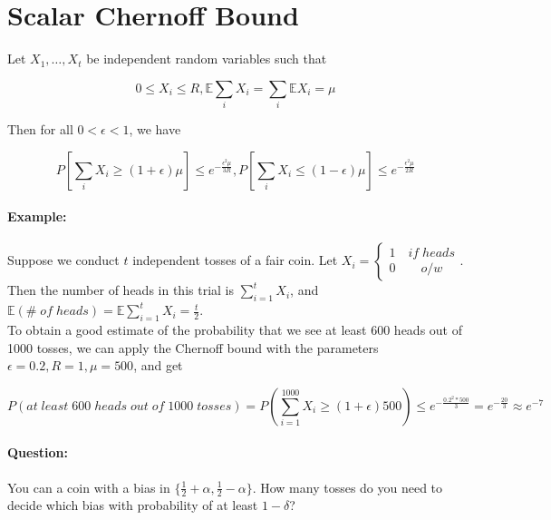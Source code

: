 \documentclass[11pt]{article}
\begin{document}
\newcommand{\coursenum}{{CSC 2421H}}
\newcommand{\coursename}{{Graphs, Matrices, and Optimization}}
\newcommand{\courseprof}{Sushant Sachdeva}


\section{Scalar Chernoff Bound}

\begin{definition}
Let $X_1, \dots, X_t$ be independent random variables such that 

\[
	0 \le X_i \le R, \mathbb{E} \sum_{i} X_i = \sum_{i} \mathbb{E} X_i = \mu
\]

Then for all $0<\epsilon<1$, we have

\[
	P[\sum_{i} X_i \ge (1+\epsilon)\mu] \le e^{-\frac{\epsilon^2 \mu}{3R}}, P[\sum_{i} X_i \le (1-\epsilon)\mu] \le e^{-\frac{\epsilon^2 \mu}{2R}}
\]

\end{definition}

\paragraph{Example:} 

Suppose we conduct $t$ independent tosses of a fair coin. Let $X_i=\begin{cases} 1 \quad if \; heads \\ 0 \qquad o/w \end{cases}$. Then the number of heads in this trial is $\sum_{i=1}^{t} X_i$, and $\mathbb{E}(\# \; of \; heads)=\mathbb{E}\sum_{i=1}^{t} X_i = \frac{t}{2}$.\\

To obtain a good estimate of the probability that we see at least 600 heads out of 1000 tosses, we can apply the Chernoff bound with the parameters $\epsilon=0.2, R=1, \mu=500$, and get

\[
	P(at \; least \; 600 \; heads \; out \; of \; 1000 \; tosses) = P(\sum_{i=1}^{1000} X_i \ge (1+\epsilon) 500) \le e^{-\frac{0.2^2 * 500}{3}}= e^{-\frac{20}{3}} \approx e^{-7}
\]

\paragraph{Question:}

You can a coin with a bias in $\{\frac{1}{2}+\alpha, \frac{1}{2}-\alpha\}$. How many tosses do you need to decide which bias with probability of at least $1-\delta$?
\end{document}
